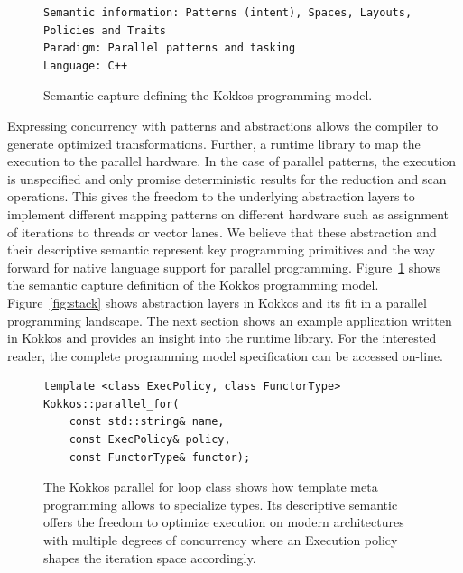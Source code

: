 \begin{figure}[h]
\begin{Verbatim}[frame=leftline]
Semantic information: Patterns (intent), Spaces, Layouts, 
Policies and Traits
Paradigm: Parallel patterns and tasking
Language: C++
\end{Verbatim}
\caption{Semantic capture defining the Kokkos programming model.}
\label{fig:SemCaptureKokkos}
\end{figure}

Expressing concurrency with patterns and abstractions allows the compiler to generate optimized transformations. Further, a runtime library to map the execution to the parallel hardware. In the case of parallel patterns, the execution is unspecified and only promise deterministic results for the reduction and scan operations. This gives the freedom to the underlying abstraction layers to implement different mapping patterns on different hardware such as assignment of iterations to threads or vector lanes. We believe that these abstraction and their descriptive semantic represent key programming primitives and the way forward for native language support for parallel programming.
Figure~\ref{fig:SemCaptureKokkos} shows the semantic capture definition of the Kokkos programming model. 
Figure~\ref{fig:stack} shows abstraction layers in Kokkos and its fit in a parallel programming landscape.
The next section shows an example application written in Kokkos and provides an insight into the runtime library. For the interested reader, the complete programming model specification can be accessed on-line\cite{pub:KOKKOS}.

\begin{figure}
\begin{Verbatim}[frame=leftline]
template <class ExecPolicy, class FunctorType>
Kokkos::parallel_for(
    const std::string& name, 
    const ExecPolicy& policy, 
    const FunctorType& functor);
\end{Verbatim}
\caption{The Kokkos parallel for loop class shows how template meta programming allows to specialize types. Its descriptive semantic offers the freedom to optimize execution on modern architectures with multiple degrees of concurrency where an Execution policy shapes the iteration space accordingly.}
\label{fig:parallelForKokkos}
\end{figure}


